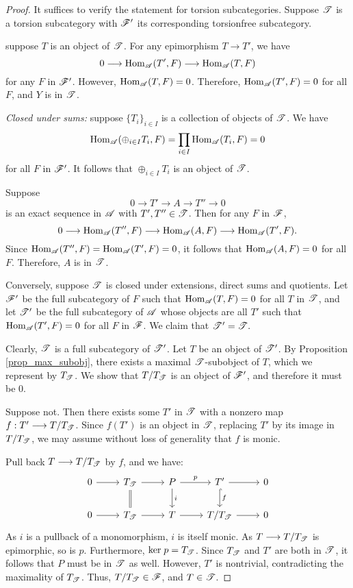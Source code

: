 \begin{proof}
It suffices to verify the statement for torsion subcategories.
Suppose $\mathscr{T}$ is a torsion subcategory with $\mathscr{F}'$ its 
corresponding torsionfree subcategory. 

 suppose $T$ is an object of 
$\mathscr{T}$. For any epimorphism $T \to T'$, we have 
\[
0 \longrightarrow \mathrm{Hom}_{\mathscr{A}}(T', F) \longrightarrow \mathrm{Hom}_{\mathscr{A}}(T, F)
\]
for any $F$ in $\mathscr{F}'$. However, $\mathrm{Hom}_{\mathscr{A}}(T, F) = 0$.
Therefore, $\mathrm{Hom}_{\mathscr{A}}(T', F) = 0$ for all $F$, and $Y$ is
in $\mathscr{T}$.

\emph{Closed under sums:} suppose $\{T_i\}_{i \in I}$ is a 
collection of objects of $\mathscr{T}$. We have
\[
\mathrm{Hom}_{\mathscr{A}}( \oplus_{i \in I} T_i, F) = \prod_{i \in I}
\mathrm{Hom}_{\mathscr{A}}( T_i, F) = 0
\]
for all $F$ in $\mathscr{F}'$. It follows that $\oplus_{i \in I} T_i$
is an object of $\mathscr{T}$.

 Suppose 
\[
0 \to T' \to A \to T'' \to 0
\]
is an exact sequence in $\mathscr{A}$ with $T', T'' \in \mathscr{T}$.
Then for any $F$ in $\mathscr{F}$, 
\[
0 \longrightarrow \mathrm{Hom}_{\mathscr{A}}(T'', F) \longrightarrow \mathrm{Hom}_{\mathscr{A}}(A, F) \longrightarrow
\mathrm{Hom}_{\mathscr{A}}(T', F).
\]
Since $\mathrm{Hom}_{\mathscr{A}}(T'', F) = \mathrm{Hom}_{\mathscr{A}}(T', F) = 0$,
it follows that $\mathrm{Hom}_{\mathscr{A}}(A, F) = 0$ for all $F$. Therefore, 
$A$ is in $\mathscr{T}$.

Conversely, suppose $\mathscr{T}$ is closed under extensions, direct 
sums and quotients. Let $\mathscr{F}'$ be the full subcategory of $F$ 
such that $\mathrm{Hom}_{\mathscr{A}}(T, F) = 0$ for all $T$ in $\mathscr{T}$, and let 
$\mathscr{T}'$ be the full subcategory of $\mathscr{A}$ whose objects are 
all $T'$ such that $\mathrm{Hom}_{\mathscr{A}}(T', F) = 0$ for all $F$ in 
$\mathscr{F}$. We claim that $\mathscr{T'} = \mathscr{T}.$

Clearly, $\mathscr{T}$ is a full subcategory of $\mathscr{T'}$. Let $T$ be
an object of $\mathscr{T'}$. By Proposition \ref{prop_max_subobj}, there 
exists a maximal $\mathscr{T}$-subobject of $T$, which we represent by
$T_{\mathscr{T}}$. We show that $T/T_{\mathscr{T}}$ is an object of 
$\mathscr{F}'$, and therefore it must be 0.

Suppose not. Then there exists some $T'$ in $\mathscr{T}$ with a 
nonzero map $f: T' \longrightarrow T/T_{\mathscr{T}}$. Since $f(T')$ is an object 
in $\mathscr{T}$, replacing $T'$ by its image in $T/T_{\mathscr{T}}$, we 
may assume without loss of generality that $f$ is monic.

Pull back $T \longrightarrow T/T_{\mathscr{T}}$ by $f$, and we have:
\[
\begin{tikzcd}
0 \arrow{r} &
T_{\Cat{T}} \arrow{r}\arrow[equals]{d} &
P \arrow{r}{p} \arrow{d}{i} &
T' \arrow{r} \arrow[hook]{d}{f} &
0 \\
0 \arrow{r} &
T_{\Cat{T}} \arrow{r} &
T \arrow{r} &
T/T_{\Cat{T}} \arrow{r} &
0
\end{tikzcd}
\]
As $i$ is a pullback of a monomorphism, $i$ is itself monic.  As $T
\longrightarrow T/T_{\mathscr{T}}$ is epimorphic, so is $p$. Furthermore, $\mathrm{ker}\; p =
T_{\mathscr{T}}$. Since $T_{\mathscr{T}}$ and $T'$ are both in $\mathscr{T}$, it
follows that $P$ must be in $\mathscr{T}$ as well. However, $T'$ is
nontrivial, contradicting the maximality of $T_{\mathscr{T}}$. Thus,
$T/T_{\mathscr{T}} \in \mathscr{F}$, and $T \in \mathscr{T}$.
\end{proof}


